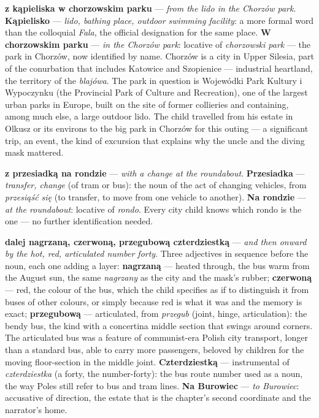 \textbf{z kąpieliska w chorzowskim parku} ---
\textit{from the lido in the Chorzów park}.
\textbf{Kąpielisko} --- \textit{lido, bathing
place, outdoor swimming facility}: a more formal
word than the colloquial \textit{Fala}, the
official designation for the same place.
\textbf{W chorzowskim parku} --- \textit{in the
Chorzów park}: locative of \textit{chorzowski park}
--- the park in Chorzów, now identified by name.
Chorzów is a city in Upper Silesia, part of the
conurbation that includes Katowice and Szopienice
--- industrial heartland, the territory of the
\textit{blajówa}. The park in question is Wojewódki
Park Kultury i Wypoczynku (the Provincial Park of
Culture and Recreation), one of the largest urban
parks in Europe, built on the site of former
collieries and containing, among much else, a
large outdoor lido. The child travelled from his
estate in Olkusz or its environs to the big park
in Chorzów for this outing --- a significant trip,
an event, the kind of excursion that explains why
the uncle and the diving mask mattered.

\textbf{z przesiadką na rondzie} --- \textit{with a
change at the roundabout}. \textbf{Przesiadka} ---
\textit{transfer, change} (of tram or bus): the
noun of the act of changing vehicles, from
\textit{przesiąść się} (to transfer, to move from
one vehicle to another). \textbf{Na rondzie} ---
\textit{at the roundabout}: locative of
\textit{rondo}. Every city child knows which
rondo is the one --- no further identification
needed.

\textbf{dalej nagrzaną, czerwoną, przegubową
czterdziestką} --- \textit{and then onward by the
hot, red, articulated number forty}. Three
adjectives in sequence before the noun, each one
adding a layer: \textbf{nagrzaną} --- heated
through, the bus warm from the August sun, the
same \textit{nagrzany} as the city and the mask's
rubber; \textbf{czerwoną} --- red, the colour of
the bus, which the child specifies as if to
distinguish it from buses of other colours, or
simply because red is what it was and the memory
is exact; \textbf{przegubową} --- articulated,
from \textit{przegub} (joint, hinge, articulation):
the bendy bus, the kind with a concertina middle
section that swings around corners. The articulated
bus was a feature of communist-era Polish city
transport, longer than a standard bus, able to
carry more passengers, beloved by children for
the moving floor-section in the middle joint.
\textbf{Czterdziestką} --- instrumental of
\textit{czterdziestka} (a forty, the number-forty):
the bus route number used as a noun, the way
Poles still refer to bus and tram lines.
\textbf{Na Burowiec} --- \textit{to Burowiec}:
accusative of direction, the estate that is the
chapter's second coordinate and the narrator's
home.

